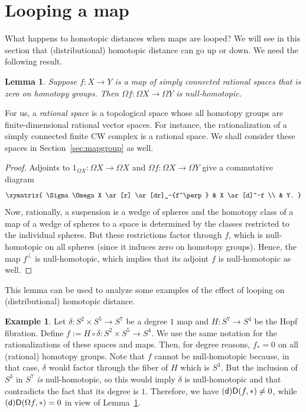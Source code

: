 \documentclass[amscd,amssymb,verbatim,10pt]{amsart}
\numberwithin{equation}{section}
\theoremstyle{plain}
\newtheorem{lemma}[theorem]{Lemma}
\theoremstyle{definition}
\newtheorem{ex}[theorem]{Example}
\newcommand{\D}{{\sf {D}}}
\newcommand{\sd}{{(\sf {d})}}
\begin{document}
\section{Looping a map}\label{sec:looping}
What happens to homotopic distances when maps are looped? We will see in this section that (distributional) homotopic distance can go up or down. We need the following result.

\begin{lemma}\label{lem:zerohomo}
Suppose $f\colon X \to Y$ is a map of simply connected rational spaces that is 
zero on homotopy groups. Then $\Omega f\colon \Omega X
\to \Omega Y$ is null-homotopic.
\end{lemma}

For us, a \emph{rational space} is a topological space whose all homotopy groups are finite-dimensional rational vector spaces. For instance, the rationalization of a simply connected finite CW complex is a rational space. We shall consider these spaces in Section~\ref{sec:mapgroup} as well.

\begin{proof}
Adjoints to $1_{\Omega X}\colon \Omega X \to \Omega X$ and $\Omega f\colon 
\Omega X \to \Omega Y$ give a commutative diagram
$$\xymatrix{
\Sigma\Omega X \ar[r] \ar[dr]_-{f^\perp} & X \ar[d]^-f \\
& Y.
}
$$
Now, rationally, a suspension is a wedge of spheres and the homotopy class
of a map of a wedge of spheres to a space is determined by the classes restricted to the 
individual spheres. But these restrictions factor through $f$, which is null-homotopic
on all spheres (since it induces zero on homotopy groups). Hence, the map $f^\perp$
is null-homotopic, which implies that its adjoint $f$ is null-homotopic as well.
\end{proof}

This lemma can be used to analyze some examples of the effect of looping on (distributional) homotopic distance.

\begin{ex}\label{exam:Ddown}
Let $\delta\colon S^2 \times S^5 \to S^7$ be a degree $1$ map and $H\colon S^7 \to S^4$ be the Hopf fibration. Define $f:=H\circ \delta\colon S^2 \times S^5 \to S^4$. We use the same 
notation for the rationalizations of these
spaces and maps. Then, for degree reasons, $f_*=0$ on all (rational) homotopy groups. 
Note that $f$ cannot be null-homotopic
because, in that case, $\delta$ would factor through the fiber of $H$ which is $S^3$. 
But the inclusion of $S^3$ in $S^7$ \emph{is}
null-homotopic, so this would imply $\delta$ is null-homotopic and that contradicts the 
fact that its degree is $1$. Therefore, we
have $\sd\D(f,*)\not = 0$, while $\sd\D(\Omega f,*)=0$ in view of Lemma~\ref{lem:zerohomo}.
\end{ex}
\end{document}
